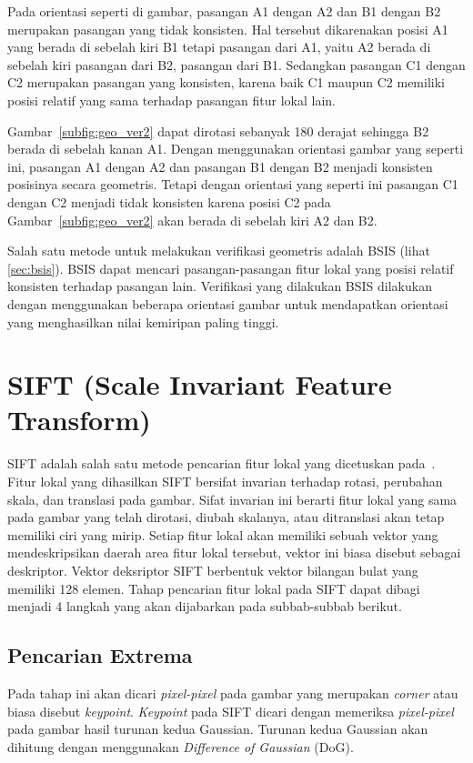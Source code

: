 Pada orientasi seperti di gambar, pasangan A1 dengan A2 dan B1 dengan B2 merupakan pasangan yang tidak konsisten. Hal tersebut dikarenakan posisi A1 yang berada di sebelah kiri B1 tetapi pasangan dari A1, yaitu A2 berada di sebelah kiri pasangan dari B2, pasangan dari B1. Sedangkan pasangan C1 dengan C2 merupakan pasangan yang konsisten, karena baik C1 maupun C2 memiliki posisi relatif yang sama terhadap pasangan fitur lokal lain.

Gambar~\ref{subfig:geo_ver2} dapat dirotasi sebanyak 180 derajat sehingga B2 berada di sebelah kanan A1. Dengan menggunakan orientasi gambar yang seperti ini, pasangan A1 dengan A2 dan pasangan B1 dengan B2 menjadi konsisten posisinya secara geometris. Tetapi dengan orientasi yang seperti ini pasangan C1 dengan C2 menjadi tidak konsisten karena posisi C2 pada Gambar~\ref{subfig:geo_ver2} akan berada di sebelah kiri A2 dan B2.

Salah satu metode untuk melakukan verifikasi geometris adalah BSIS (lihat \ref{sec:bsis}). BSIS dapat mencari pasangan-pasangan fitur lokal yang posisi relatif konsisten terhadap pasangan lain. Verifikasi yang dilakukan BSIS dilakukan dengan menggunakan beberapa orientasi gambar untuk mendapatkan orientasi yang menghasilkan nilai kemiripan paling tinggi.


\section{SIFT (Scale Invariant Feature Transform)}
\label{sec:sift}
SIFT adalah salah satu metode pencarian fitur lokal yang dicetuskan pada~\cite{lowe2004sift}. Fitur lokal yang dihasilkan SIFT bersifat invarian terhadap rotasi, perubahan skala, dan translasi pada gambar. Sifat invarian ini berarti fitur lokal yang sama pada gambar yang telah dirotasi, diubah skalanya, atau ditranslasi akan tetap memiliki ciri yang mirip. Setiap fitur lokal akan memiliki sebuah vektor yang mendeskripsikan daerah area fitur lokal tersebut, vektor ini biasa disebut sebagai deskriptor. Vektor deksriptor SIFT berbentuk vektor bilangan bulat yang memiliki 128 elemen. Tahap pencarian fitur lokal pada SIFT dapat dibagi menjadi 4 langkah yang akan dijabarkan pada subbab-subbab berikut.

\subsection{Pencarian Extrema}
Pada tahap ini akan dicari \textit{pixel-pixel} pada gambar yang merupakan \textit{corner} atau biasa disebut \textit{keypoint}. \textit{Keypoint} pada SIFT dicari dengan memeriksa \textit{pixel-pixel} pada gambar hasil turunan kedua Gaussian. Turunan kedua Gaussian akan dihitung dengan menggunakan \textit{Difference of Gaussian} (DoG).

